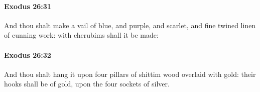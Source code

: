 		\paragraph{Exodus 26:31} %
			\label{EXODUS-26-31}

			And thou shalt make a vail of blue, and purple, and scarlet, and fine twined linen of cunning work: with cherubims shall it be made:


		\paragraph{Exodus 26:32} %
			\label{EXODUS-26-32}

			And thou shalt hang it upon four pillars of shittim wood overlaid with gold: their hooks shall be of gold, upon the four sockets of silver.


